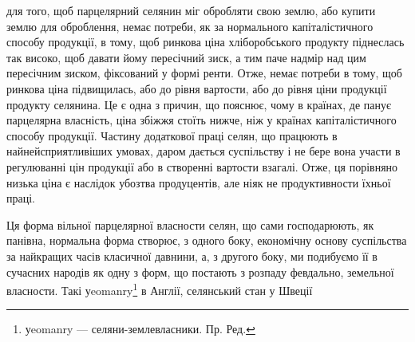 для того, щоб парцелярний селянин міг обробляти свою землю, або купити
землю для оброблення, немає потреби, як за нормального капіталістичного
способу продукції, в тому, щоб ринкова ціна хліборобського продукту піднеслась
так високо, щоб давати йому пересічний зиск, а тим паче надмір над цим
пересічним зиском, фіксований у формі ренти. Отже, немає потреби в тому,
щоб ринкова ціна підвищилась, або до рівня вартости, або до рівня ціни продукції
продукту селянина. Це є одна з причин, що пояснює, чому в країнах,
де панує парцелярна власність, ціна збіжжя стоїть нижче, ніж у країнах капіталістичного
способу продукції. Частину додаткової праці селян, що працюють
в найнейсприятливіших умовах, даром дається суспільству і не бере вона участи
в регулюванні цін продукції або в створенні вартости взагалі. Отже, ця порівняно
низька ціна є наслідок убозтва продуцентів, але ніяк не продуктивности
їхньої праці.

Ця форма вільної парцелярної власности селян, що сами господарюють, як
панівна, нормальна форма створює, з одного боку, економічну основу суспільства
за найкращих часів класичної давнини, а, з другого боку, ми подибуємо
її в сучасних народів як одну з форм, що постають з розпаду февдально,
земельної власности. Такі уeomanry\footnote*{
уeomanry — селяни-землевласники. Пр. Ред.
} в Англії, селянський стан у Швеції
\parbreak{}  %
